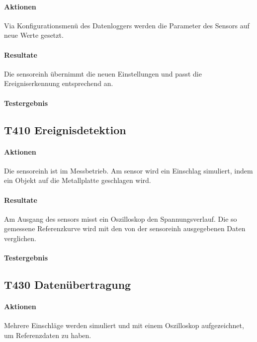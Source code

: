 \paragraph{Aktionen} Via Konfigurationsmenü des Datenloggers werden die Parameter des Sensors auf neue Werte gesetzt. 

\paragraph{Resultate} Die \gls{sensoreinh} übernimmt die neuen Einstellungen und passt die Ereigniserkennung entsprechend an.

\paragraph{Testergebnis} 

\subsection{T410 Ereignisdetektion}
\paragraph{Aktionen} Die \gls{sensoreinh} ist im Messbetrieb. Am \gls{sensor} wird ein Einschlag simuliert, indem ein Objekt auf die Metallplatte geschlagen wird. 

\paragraph{Resultate} Am Ausgang des \gls{sensor}s misst ein Oszilloskop den Spannungsverlauf. Die so gemessene Referenzkurve wird mit den von der \gls{sensoreinh} ausgegebenen Daten verglichen.

\paragraph{Testergebnis} 

\subsection{T430 Datenübertragung}
\paragraph{Aktionen} Mehrere Einschläge werden simuliert und mit einem Oszilloskop aufgezeichnet, um Referenzdaten zu haben.

